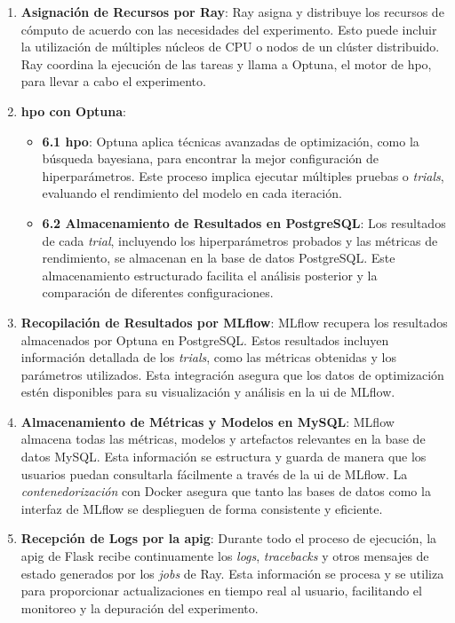 \begin{enumerate}
    \item \textbf{Asignación de Recursos por Ray}:
          Ray asigna y distribuye los recursos de cómputo de acuerdo con las necesidades del experimento. Esto puede incluir la utilización de múltiples núcleos de CPU o nodos de un clúster distribuido. Ray coordina la ejecución de las tareas y llama a Optuna, el motor de \acrlong{hpo}, para llevar a cabo el experimento.

    \item \textbf{\acrlong{hpo} con Optuna}:
          \begin{itemize}
              \item \textbf{6.1 \Gls{hpo}}: Optuna aplica técnicas avanzadas de optimización, como la búsqueda bayesiana, para encontrar la mejor configuración de hiperparámetros. Este proceso implica ejecutar múltiples pruebas o \textit{trials}, evaluando el rendimiento del modelo en cada iteración.
              \item \textbf{6.2 Almacenamiento de Resultados en PostgreSQL}: Los resultados de cada \textit{trial}, incluyendo los hiperparámetros probados y las métricas de rendimiento, se almacenan en la base de datos PostgreSQL. Este almacenamiento estructurado facilita el análisis posterior y la comparación de diferentes configuraciones.
          \end{itemize}

    \item \textbf{Recopilación de Resultados por MLflow}:
          MLflow recupera los resultados almacenados por Optuna en PostgreSQL. Estos resultados incluyen información detallada de los \textit{trials}, como las métricas obtenidas y los parámetros utilizados. Esta integración asegura que los datos de optimización estén disponibles para su visualización y análisis en la \acrlong{ui} de MLflow.

    \item \textbf{Almacenamiento de Métricas y Modelos en MySQL}:
          MLflow almacena todas las métricas, modelos y \gls{artefactos} relevantes en la base de datos MySQL. Esta información se estructura y guarda de manera que los usuarios puedan consultarla fácilmente a través de la \acrshort{ui} de MLflow. La \textit{contenedorización} con Docker asegura que tanto las bases de datos como la interfaz de MLflow se desplieguen de forma consistente y eficiente.

    \item \textbf{Recepción de Logs por la \Gls{apig}}:
          Durante todo el proceso de ejecución, la \Gls{apig} de Flask recibe continuamente los \textit{logs}, \textit{tracebacks} y otros mensajes de estado generados por los \textit{jobs} de Ray. Esta información se procesa y se utiliza para proporcionar actualizaciones en tiempo real al usuario, facilitando el monitoreo y la depuración del experimento.


\end{enumerate}
